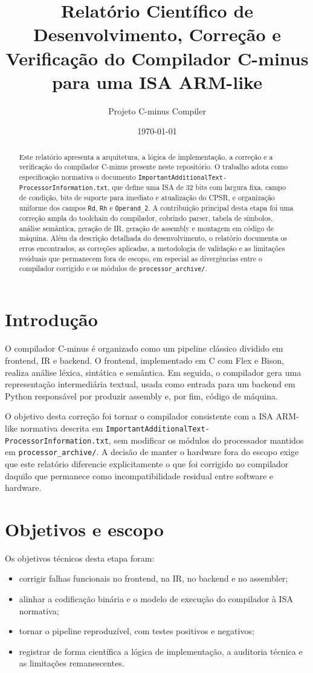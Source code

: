 \documentclass[12pt,a4paper]{article}
\title{Relatório Científico de Desenvolvimento, Correção e Verificação do Compilador C-minus para uma ISA ARM-like}
\author{Projeto C-minus Compiler}
\date{\today}
\begin{document}
\maketitle

\begin{abstract}
Este relatório apresenta a arquitetura, a lógica de implementação, a correção e a verificação do compilador C-minus presente neste repositório. O trabalho adota como especificação normativa o documento \texttt{ImportantAdditionalText-ProcessorInformation.txt}, que define uma ISA de 32 bits com largura fixa, campo de condição, bits de suporte para imediato e atualização do CPSR, e organização uniforme dos campos \texttt{Rd}, \texttt{Rh} e \texttt{Operand\_2}. A contribuição principal desta etapa foi uma correção ampla do toolchain do compilador, cobrindo parser, tabela de símbolos, análise semântica, geração de IR, geração de assembly e montagem em código de máquina. Além da descrição detalhada do desenvolvimento, o relatório documenta os erros encontrados, as correções aplicadas, a metodologia de validação e as limitações residuais que permanecem fora de escopo, em especial as divergências entre o compilador corrigido e os módulos de \texttt{processor\_archive/}.
\end{abstract}

\section{Introdução}
O compilador C-minus é organizado como um pipeline clássico dividido em frontend, IR e backend. O frontend, implementado em C com Flex e Bison, realiza análise léxica, sintática e semântica. Em seguida, o compilador gera uma representação intermediária textual, usada como entrada para um backend em Python responsável por produzir assembly e, por fim, código de máquina.

O objetivo desta correção foi tornar o compilador consistente com a ISA ARM-like normativa descrita em \texttt{ImportantAdditionalText-ProcessorInformation.txt}, sem modificar os módulos do processador mantidos em \texttt{processor\_archive/}. A decisão de manter o hardware fora do escopo exige que este relatório diferencie explicitamente o que foi corrigido no compilador daquilo que permanece como incompatibilidade residual entre software e hardware.

\section{Objetivos e escopo}
Os objetivos técnicos desta etapa foram:
\begin{itemize}[leftmargin=1.5em]
    \item corrigir falhas funcionais no frontend, na IR, no backend e no assembler;
    \item alinhar a codificação binária e o modelo de execução do compilador à ISA normativa;
    \item tornar o pipeline reproduzível, com testes positivos e negativos;
    \item registrar de forma científica a lógica de implementação, a auditoria técnica e as limitações remanescentes.
\end{itemize}
\end{document}
